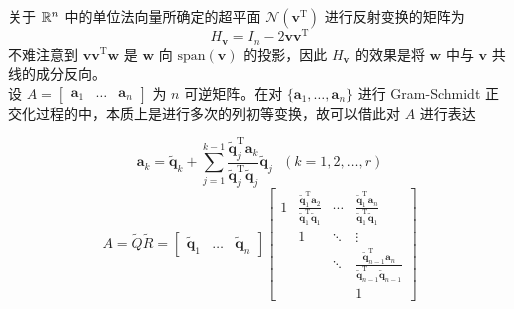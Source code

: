 \documentclass[./main.tex]{subfiles}
\begin{document}
关于 $\mathbb{R}^{n}$ 中的单位法向量所确定的超平面 $\mathcal{N}(\bm{v}^{\mathrm{T}})$ 进行反射变换的矩阵为
\begin{equation}
    H_{\bm{v}}=I_n-2\bm{v}\bm{v}^{\mathrm{T}}
\end{equation}
不难注意到 $\bm{v}\bm{v}^{\mathrm{T}}\bm{w}$ 是 $\bm{w}$ 向 $\mathrm{span}(\bm{v})$ 的投影，因此 $H_{\bm{v}}$ 的效果是将 $\bm{w}$ 中与 $\bm{v}$ 共线的成分反向。\\

设 $A=\begin{bmatrix}\bm{a}_1&\dots&\bm{a}_n\end{bmatrix}$ 为 $n$ 可逆矩阵。在对 $\{\bm{a}_1,\dots,\bm{a}_n\}$ 进行 Gram-Schmidt 正交化过程的中，本质上是进行多次的列初等变换，故可以借此对 $A$ 进行表达

\begin{equation}
    \bm{a}_k=\bm{\widetilde{q}}_k+\sum_{j=1}^{k-1}\frac{\bm{\widetilde{q}}_j^{\mathrm{T}}\bm{a}_k}{\bm{\widetilde{q}}_j^{\mathrm{T}}\bm{\widetilde{q}}_j}\bm{\widetilde{q}}_j \ \ \ (k=1,2,\dots,r)
\end{equation}
\begin{equation}
    A=\widetilde{Q}\widetilde{R}=\begin{bmatrix}\widetilde{\bm{q}}_1&\dots&\widetilde{\bm{q}}_n\end{bmatrix}
    \begin{bmatrix}
        1 & \frac{\widetilde{\bm{q}}_1^{\mathrm{T}}\bm{a}_2}{\widetilde{\bm{q}}_1^{\mathrm{T}}\widetilde{\bm{q}}_1} & \cdots & \frac{\widetilde{\bm{q}}_1^{\mathrm{T}}\bm{a}_n}{\widetilde{\bm{q}}_1^{\mathrm{T}}\widetilde{\bm{q}}_1}             \\
          & 1                                                                                                       & \ddots & \vdots                                                                                                              \\
          &                                                                                                         & \ddots & \frac{\widetilde{\bm{q}}_{n-1}^{\mathrm{T}}\bm{a}_n}{\widetilde{\bm{q}}_{n-1}^{\mathrm{T}}\widetilde{\bm{q}}_{n-1}} \\
          &                                                                                                         &        & 1
    \end{bmatrix}
\end{equation}
\end{document}
